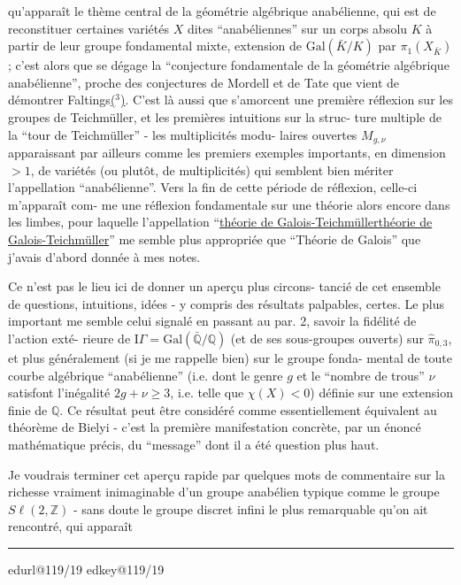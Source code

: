 \documentclass[11pt,a4paper]{article}
\makeatletter
\newif\ifreading
\newif\ifenglish
\def\CurrentScanURL{}
\def\CurrentPageKey{}
\def\CurrentApparatus{}
\newcommand{\scanpage}[1]{%
  \clearpage
  \expandafter\let\expandafter\CurrentScanURL\csname edurl@#1\endcsname
  \expandafter\let\expandafter\CurrentPageKey\csname edkey@#1\endcsname
  \def\CurrentApparatus{}%
  \hypertarget{scan-\CurrentPageKey}{}%
  \typeout{EDITION-SCAN: \CurrentPageKey; PDFPAGE: \the\numexpr\ReadonlyShipoutCounter+1\relax}%
  \ifreading
    \marginnote{\raggedright\scriptsize\sffamily\href{\CurrentScanURL}{119 / \csname edpage@#1\endcsname}}%
  \else
    \noindent{\small\sffamily\href{\CurrentScanURL}{[scan #1]}}\par\smallskip
  \fi}
\newcommand{\mspage}[1]{%
  \ifreading\marginnote{\raggedright\scriptsize\sffamily p.\,#1}[2\baselineskip]%
  \else\noindent{\small\sffamily[p.\,#1]}\par\smallskip\fi}
\let\TextUline\uline
\renewcommand{\uline}[1]{\ifmmode\underline{#1}\else\TextUline{#1}\fi}
\newcommand{\margin}[1]{%
  \sbox{\MarginalTestBox}{\parbox{\marginparwidth}{\raggedright\footnotesize#1}}%
  \ifdim\dimexpr\ht\MarginalTestBox+\dp\MarginalTestBox\relax>3\baselineskip
    \par\smallskip\noindent\begin{minipage}{\linewidth}\hrule\smallskip
    {\footnotesize\textcolor{HandInk}{\ifenglish Marginal note:\else Note marginale :\fi\ #1}}\smallskip\hrule\end{minipage}\par\smallskip
  \else
    \marginnote{\raggedright\footnotesize\textcolor{HandInk}{#1}}%
  \fi}
\newcommand{\finishscan}{\ifx\CurrentApparatus\empty\else\par\bigskip\noindent\rule{.35\linewidth}{.35pt}\par\smallskip{\footnotesize\setlength{\parskip}{3pt}\CurrentApparatus}\fi}
\newcommand{\notecall}[3]{\hypertarget{#2}{\hyperlink{note-#1}{#3}}}
\makeatother
\begin{document}
qu'apparaît le thème central de la géométrie algébrique anabélienne,
qui est de reconstituer certaines variétés $X$ dites ``anabéliennes''
sur un corps absolu $K$ à partir de leur groupe fondamental mixte,
extension de $\mathrm{Gal}(\bar{K}/K)$ par $\pi_1(X_{\bar{K}})$ ; c'est alors que se dégage la
``conjecture fondamentale de la géométrie algébrique anabélienne'',
proche des conjectures de Mordell et de Tate que vient de démontrer
Faltings\notecall{copy1-3}{call-esq_119_018-3-1}{($^3$)}. C'est là aussi que s'amorcent une première réflexion sur
les groupes de Teichmüller, et les premières intuitions sur la struc-%
ture multiple de la ``tour de Teichmüller'' - les multiplicités modu-%
laires ouvertes $M_{g,\nu}$ apparaissant par ailleurs comme les premiers
exemples importants, en dimension $> 1$, de variétés (ou plutôt, de
multiplicités) qui semblent bien mériter l'appellation ``anabélienne''.
Vers la fin de cette période de réflexion, celle-ci m'apparaît com-%
me une réflexion fondamentale sur une théorie alors encore dans les
limbes, pour laquelle l'appellation ``\uline{théorie de Galois-Teichmüller}''
me semble plus appropriée que ``Théorie de Galois'' que j'avais d'abord
donnée à mes notes.

Ce n'est pas le lieu ici de donner un aperçu plus circons-%
tancié de cet ensemble de questions, intuitions, idées - y compris
des résultats palpables, certes. Le plus important me semble celui
signalé en passant au par. 2, savoir la fidélité de l'action exté-%
rieure de $\mathrm{I}\!\Gamma = \mathrm{Gal}(\bar{\mathbb{Q}}/\mathbb{Q})$ (et de ses sous-groupes ouverts) sur $\hat{\pi}_{0,3}$,
et plus généralement (si je me rappelle bien) sur le groupe fonda-%
mental de toute courbe algébrique ``anabélienne'' (i.e. dont le genre
$g$ et le ``nombre de trous'' $\nu$ satisfont l'inégalité $2g + \nu \geq 3$,
i.e. telle que $\chi(X) < 0$) définie sur une extension finie de $\mathbb{Q}$. Ce
résultat peut être considéré comme essentiellement équivalent au
théorème de Bielyi - c'est la première manifestation concrète, par
un énoncé mathématique précis, du ``message'' dont il a été question
plus haut.

Je voudrais terminer cet aperçu rapide par quelques mots
de commentaire sur la richesse vraiment inimaginable d'un groupe
anabélien typique comme le groupe $S\ell(2,\mathbb{Z})$ - sans doute le groupe
discret infini le plus remarquable qu'on ait rencontré, qui apparaît

\margin{18}

\finishscan
\scanpage{119/19}
\mspage{17}
\end{document}
